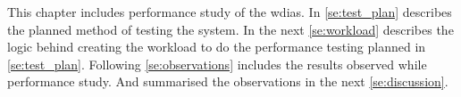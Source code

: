 
This chapter includes performance study of the \acrshort{wdias}. In \cref{se:test_plan} describes the planned method of testing the system.
In the next \cref{se:workload} describes the logic behind creating the workload to do the performance testing planned in \cref{se:test_plan}.
Following \cref{se:observations} includes the results observed while performance study. And summarised the observations in the next \cref{se:discussion}.
